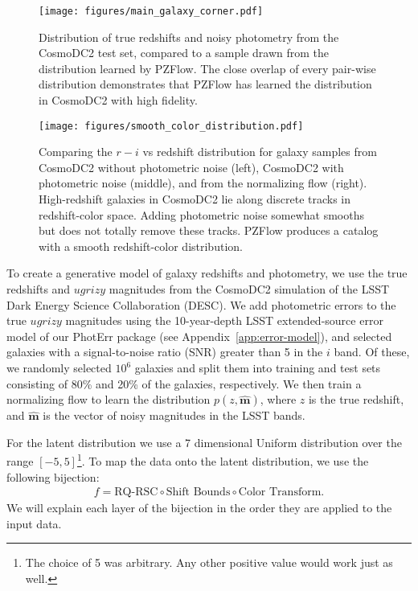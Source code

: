 \documentclass[twocolumn,twocolappendix]{aastex631}
\begin{document}
\begin{figure*}[t]
    \begin{centering}
        \texttt{[image: figures/main\_galaxy\_corner.pdf]}
        \caption{
            Distribution of true redshifts and noisy photometry from the CosmoDC2 test set, compared to a sample drawn from the distribution learned by PZFlow.
            The close overlap of every pair-wise distribution demonstrates that PZFlow has learned the distribution in CosmoDC2 with high fidelity.
        }
        \label{fig:main-corner}
    \end{centering}
\end{figure*}

\begin{figure*}[t]
    \begin{centering}
        \texttt{[image: figures/smooth\_color\_distribution.pdf]}
        \caption{
            Comparing the $r-i$ vs redshift distribution for galaxy samples from CosmoDC2 without photometric noise (left), CosmoDC2 with photometric noise (middle), and from the normalizing flow (right).
            High-redshift galaxies in CosmoDC2 lie along discrete tracks in redshift-color space.
            Adding photometric noise somewhat smooths but does not totally remove these tracks.
            PZFlow produces a catalog with a smooth redshift-color distribution.
        }
        \label{fig:smooth-color-dist}
    \end{centering}
\end{figure*}

To create a generative model of galaxy redshifts and photometry, we use the true redshifts and $ugrizy$ magnitudes from the CosmoDC2 simulation \citep{dc2, cosmodc2} of the LSST Dark Energy Science Collaboration (DESC).
We add photometric errors to the true $ugrizy$ magnitudes using the 10-year-depth LSST extended-source error model of our PhotErr package (see Appendix~\ref{app:error-model}), and selected galaxies with a signal-to-noise ratio (SNR) greater than 5 in the $i$ band.
Of these, we randomly selected $10^6$ galaxies and split them into training and test sets consisting of 80\% and 20\% of the galaxies, respectively.
We then train a normalizing flow to learn the distribution $p(z, \mathbf{\hat{m}})$, where $z$ is the true redshift, and $\mathbf{\hat{m}}$ is the vector of noisy magnitudes in the LSST bands.

For the latent distribution we use a 7 dimensional Uniform distribution over the range $[-5, 5]$\footnote{The choice of 5 was arbitrary. Any other positive value would work just as well.}.
To map the data onto the latent distribution, we use the following bijection:
\begin{align}
    f = \text{RQ-RSC} \circ \text{Shift Bounds} \circ \text{Color Transform}.
\end{align}
We will explain each layer of the bijection in the order they are applied to the input data.
\end{document}

